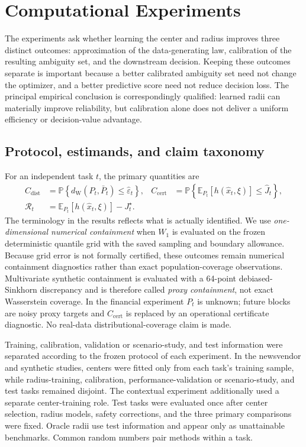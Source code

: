 \documentclass[11pt]{article}
\newcommand{\E}{\mathbb{E}}
\newcommand{\Prob}{\mathbb{P}}
\newcommand{\1}{\mathbf{1}}
\newcommand{\dW}{d_{\mathrm W}}
\begin{document}
\section{Computational Experiments}\label{sec:experiments}

The experiments ask whether learning the center and radius improves three distinct outcomes: approximation of the data-generating law, calibration of the resulting ambiguity set, and the downstream decision.  Keeping these outcomes separate is important because a better calibrated ambiguity set need not change the optimizer, and a better predictive score need not reduce decision loss.  The principal empirical conclusion is correspondingly qualified: learned radii can materially improve reliability, but calibration alone does not deliver a uniform efficiency or decision-value advantage.

\subsection{Protocol, estimands, and claim taxonomy}

For an independent task $t$, the primary quantities are
\begin{equation}\label{eq:experimental-estimands}
\begin{aligned}
C_{\mathrm{dist}}
&=\Prob\!\left\{\dW(P_t,\bar P_t)\le\widehat\varepsilon_t\right\},
&
C_{\mathrm{cert}}
&=\Prob\!\left\{\E_{P_t}[h(\widehat x_t,\xi)]\le\widehat J_t\right\},
\\
\mathcal R_t
&=\E_{P_t}[h(\widehat x_t,\xi)]-J_t^\star.
\end{aligned}
\end{equation}
The terminology in the results reflects what is actually identified.  We use \emph{one-dimensional numerical containment} when $W_1$ is evaluated on the frozen deterministic quantile grid with the saved sampling and boundary allowance.  Because grid error is not formally certified, these outcomes remain numerical containment diagnostics rather than exact population-coverage observations.  Multivariate synthetic containment is evaluated with a 64-point debiased-Sinkhorn discrepancy and is therefore called \emph{proxy containment}, not exact Wasserstein coverage.  In the financial experiment $P_t$ is unknown; future blocks are noisy proxy targets and $C_{\mathrm{cert}}$ is replaced by an operational certificate diagnostic.  No real-data distributional-coverage claim is made.

Training, calibration, validation or scenario-study, and test information were separated according to the frozen protocol of each experiment.  In the newsvendor and synthetic studies, centers were fitted only from each task's training sample, while radius-training, calibration, performance-validation or scenario-study, and test tasks remained disjoint.  The contextual experiment additionally used a separate center-training role.  Test tasks were evaluated once after center selection, radius models, safety corrections, and the three primary comparisons were fixed.  Oracle radii use test information and appear only as unattainable benchmarks.  Common random numbers pair methods within a task.
\end{document}
